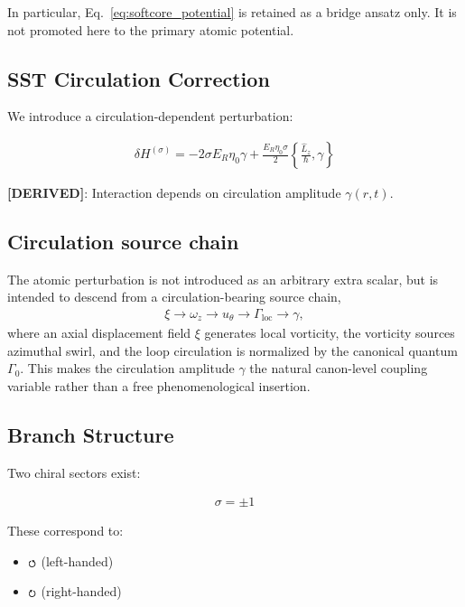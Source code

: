 \documentclass[11pt]{article}
\theoremstyle{definition}
\theoremstyle{plain}
\theoremstyle{remark}
\newcommand{\swirlarrow}{\mathchoice{\mkern-2mu\scriptstyle\boldsymbol{\circlearrowleft}}{\mkern-2mu\scriptstyle\boldsymbol{\circlearrowleft}}{\mkern-2mu\scriptscriptstyle\boldsymbol{\circlearrowleft}}{\mkern-2mu\scriptscriptstyle\boldsymbol{\circlearrowleft}}}
\newcommand{\swirlarrowcw}{\mathchoice{\mkern-2mu\scriptstyle\boldsymbol{\circlearrowright}}{\mkern-2mu\scriptstyle\boldsymbol{\circlearrowright}}{\mkern-2mu\scriptscriptstyle\boldsymbol{\circlearrowright}}{\mkern-2mu\scriptscriptstyle\boldsymbol{\circlearrowright}}}
\begin{document}
        In particular, Eq.~\eqref{eq:softcore_potential} is retained as a bridge ansatz only. It is not promoted here to the primary atomic potential.

    \subsection{SST Circulation Correction}
        
        We introduce a circulation-dependent perturbation:
        
        \begin{align}
            \delta H^{(\sigma)} = -2\sigma E_R \eta_0 \gamma + \frac{E_R \eta_0 \sigma}{2} \left\{ \frac{\hat{L}_z}{\hbar}, \gamma \right\}
            \label{eq:sst_correction}
        \end{align}
        
        \textbf{[DERIVED]}: Interaction depends on circulation amplitude $\gamma(r,t)$.

    \subsection{Circulation source chain}
        The atomic perturbation is not introduced as an arbitrary extra scalar, but is intended to descend from a circulation-bearing source chain,
        \begin{align}
            \xi \rightarrow \omega_z \rightarrow u_\theta \rightarrow \Gamma_{\mathrm{loc}} \rightarrow \gamma,
        \end{align}
        where an axial displacement field $\xi$ generates local vorticity, the vorticity sources azimuthal swirl, and the loop circulation is normalized by the canonical quantum $\Gamma_0$. This makes the circulation amplitude $\gamma$ the natural canon-level coupling variable rather than a free phenomenological insertion.
    
    \subsection{Branch Structure}
        
        Two chiral sectors exist:
        
        \begin{align}
            \sigma = \pm 1
        \end{align}
        
        These correspond to:
        
        \begin{itemize}
            \item $\swirlarrow$ (left-handed)
            \item $\swirlarrowcw$ (right-handed)
        \end{itemize}
    
\end{document}
